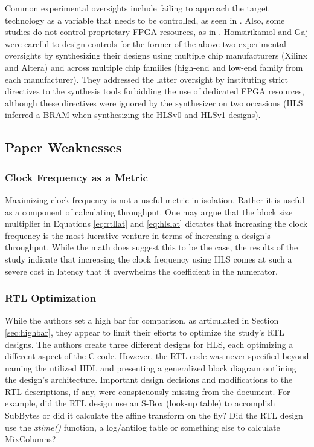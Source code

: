 \documentclass[12pt,journal,compsoc,onecolumn]{IEEEtran}
\begin{document}
Common experimental oversights include failing to approach the target technology as a variable that needs to be controlled, as seen in \cite{skalicky}. Also, some studies do not control proprietary FPGA resources, as in \cite{10}. Homsirikamol and Gaj were careful to design controls for the former of the above two experimental oversights by synthesizing their designs using multiple chip manufacturers (Xilinx and Altera) and across multiple chip families (high-end and low-end family from each manufacturer). They addressed the latter oversight by instituting strict directives to the synthesis tools forbidding the use of dedicated FPGA resources, although these directives were ignored by the synthesizer on two occasions (HLS inferred a BRAM when synthesizing the HLSv0 and HLSv1 designs).

\subsection{Paper Weaknesses}\label{sec:weaknesses}
\subsubsection{Clock Frequency as a Metric}
Maximizing clock frequency is not a useful metric in isolation. Rather it is useful as a component of calculating throughput. One may argue that the block size multiplier in Equations \ref{eq:rtllat} and \ref{eq:hlslat} dictates that increasing the clock frequency is the most lucrative venture in terms of increasing a design's throughput. While the math does suggest this to be the case, the results of the study indicate that increasing the clock frequency using HLS comes at such a severe cost in latency that it overwhelms the coefficient in the numerator.

\subsubsection{RTL Optimization}\label{sec:rtlop}
While the authors set a high bar for comparison, as articulated in Section \ref{sec:highbar}, they appear to limit their efforts to optimize the study's RTL designs. The authors create three different designs for HLS, each optimizing a different aspect of the C code. However, the RTL code was never specified beyond naming the utilized HDL and presenting a generalized block diagram outlining the design's architecture. Important design decisions and modifications to the RTL descriptions, if any, were conspicuously missing from the document. For example, did the RTL design use an S-Box (look-up table) to accomplish SubBytes or did it calculate the affine transform on the fly? Did the RTL design use the \emph{xtime()} function, a log/antilog table or something else to calculate MixColumns? 
\end{document}
